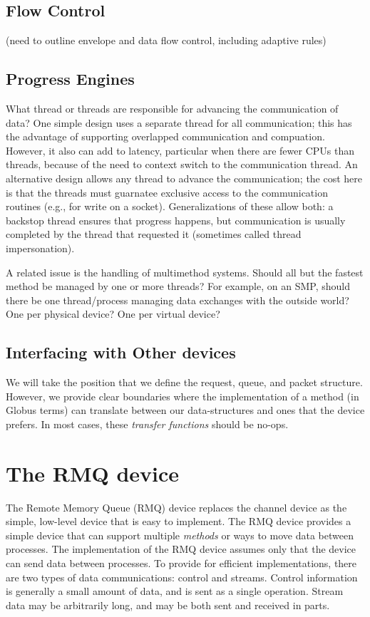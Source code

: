 \documentclass{article}
\begin{document}
\subsection{Flow Control}
(need to outline envelope and data flow control, including adaptive rules)

\subsection{Progress Engines}
What thread or threads are responsible for advancing the communication of
data?  One simple design uses a separate thread for all communication; this
has the advantage of supporting overlapped communication and compuation.
However, it also can add to latency, particular when there are fewer CPUs than
threads, because of the need to context switch to the communication thread.
An alternative design allows any thread to advance the communication; the cost
here is that the threads must guarnatee exclusive access to the communication
routines (e.g., for write on a socket).  Generalizations of these allow both:
a backstop thread ensures that progress happens, but communication is usually
completed by the thread that requested it (sometimes called thread
impersonation).  

A related issue is the handling of multimethod systems.  Should all but the
fastest method be managed by one or more threads?  For example, on an SMP,
should there be one thread/process managing data exchanges with the outside
world?  One per physical device?  One per virtual device?

\subsection{Interfacing with Other devices}
We will take the position that we define the request, queue, and packet
structure.  However, we provide clear boundaries where the implementation of a
method (in Globus terms) can translate between our data-structures and ones
that the device prefers.  In most cases, these \emph{transfer functions}
should be no-ops.

\section{The RMQ device}
The Remote Memory Queue (RMQ) device replaces the channel device as the simple,
low-level device that is easy to implement.   The RMQ device provides a simple
device that can support multiple \emph{methods} or ways to move data between
processes.  
The implementation of the RMQ device
assumes only that the device can send data between processes.  To provide for
efficient implementations, there are two types of data communications: control
and streams.  Control information is generally a small amount of data, and is
sent as a single operation.  Stream data may be arbitrarily long, and may be
both sent and received in parts.  
\end{document}
